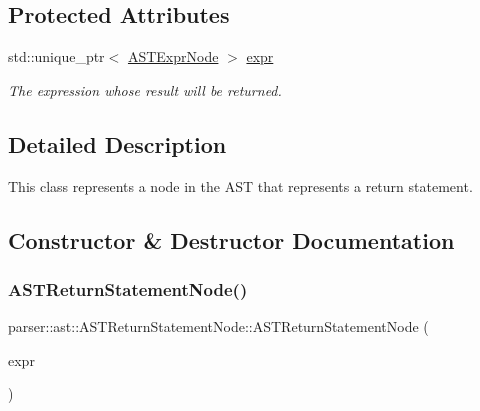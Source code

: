\subsection*{Protected Attributes}
\begin{DoxyCompactItemize}
\item 
\mbox{\label{classparser_1_1ast_1_1ASTReturnStatementNode_af0ee45b3faee9a37d6a36f7670a586f1}} 
std\+::unique\+\_\+ptr$<$ \hyperlink{classparser_1_1ast_1_1ASTExprNode}{A\+S\+T\+Expr\+Node} $>$ \hyperlink{classparser_1_1ast_1_1ASTReturnStatementNode_af0ee45b3faee9a37d6a36f7670a586f1}{expr}
\begin{DoxyCompactList}\small\item\em The expression whose result will be returned. \end{DoxyCompactList}\end{DoxyCompactItemize}


\subsection{Detailed Description}
This class represents a node in the A\+ST that represents a {\ttfamily return} statement. 

\subsection{Constructor \& Destructor Documentation}
\mbox{\label{classparser_1_1ast_1_1ASTReturnStatementNode_aa88792926907901c21090c2ad0203209}} 
\subsubsection{\texorpdfstring{A\+S\+T\+Return\+Statement\+Node()}{ASTReturnStatementNode()}}
{\footnotesize\ttfamily parser\+::ast\+::\+A\+S\+T\+Return\+Statement\+Node\+::\+A\+S\+T\+Return\+Statement\+Node (\begin{DoxyParamCaption}\item[{std\+::unique\+\_\+ptr$<$ \hyperlink{classparser_1_1ast_1_1ASTExprNode}{A\+S\+T\+Expr\+Node} $>$}]{expr }\end{DoxyParamCaption})}

